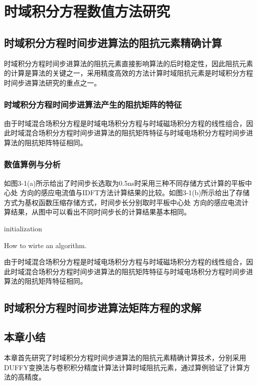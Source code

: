 \documentclass{standalone}
\begin{document}
\chapter{时域积分方程数值方法研究}
\section{时域积分方程时间步进算法的阻抗元素精确计算}
时域积分方程时间步进算法的阻抗元素直接影响算法的后时稳定性，因此阻抗元素的计算是算法的关键之一，采用精度高效的方法计算时域阻抗元素是时域积分方程时间步进算法研究的重点之一。


\subsection{时域积分方程时间步进算法产生的阻抗矩阵的特征}
由于时域混合场积分方程是时域电场积分方程与时域磁场积分方程的线性组合，因此时域混合场积分方程时间步进算法的阻抗矩阵特征与时域电场积分方程时间步进算法的阻抗矩阵特征相同。

\subsection{数值算例与分析}

如图3-1(a)所示给出了时间步长选取为0.5ns时采用三种不同存储方式计算的平板中心处 方向的感应电流值与IDFT方法计算结果的比较。如图3-1(b)所示给出了存储方式为基权函数压缩存储方式，时间步长分别取时平板中心处 方向的感应电流计算结果，从图中可以看出不同时间步长的计算结果基本相同。

\begin{algorithm}[H]
	initialization\;
\caption{How to wirte an algorithm.}
\end{algorithm}

由于时域混合场积分方程是时域电场积分方程与时域磁场积分方程的线性组合，因此时域混合场积分方程时间步进算法的阻抗矩阵特征与时域电场积分方程时间步进算法的阻抗矩阵特征相同。

\section{时域积分方程时间步进算法矩阵方程的求解}

\section{本章小结}
本章首先研究了时域积分方程时间步进算法的阻抗元素精确计算技术，分别采用DUFFY变换法与卷积积分精度计算法计算时域阻抗元素，通过算例验证了计算方法的高精度。
\end{document}

